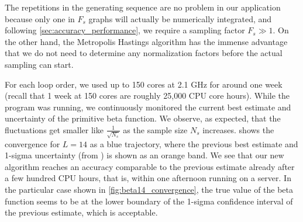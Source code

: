 \documentclass[12pt]{article}
\numberwithin{equation}{section}
\begin{document}
The repetitions in the generating sequence are no problem in our application because only one in $F_s$ graphs will actually be numerically integrated, and following \cref{sec:accuracy_performance}, we require a sampling factor $F_s \gg 1$. On the other hand, the Metropolis Hastings algorithm has the immense advantage that we do not need to determine any normalization factors before the actual sampling can start. 


For each loop order, we used up to 150 cores at 2.1 GHz for around one week (recall that 1 week at 150 cores are roughly 25,000 CPU core hours). While the program was running, we continuously monitored the current best estimate and uncertainty of the primitive beta function. We observe, as expected, that the fluctuations get smaller like $\frac{1}{\sqrt {N_s}}$ as the sample size $N_s$ increases.   shows the convergence for $L=14$ as a blue trajectory, where the previous best estimate and 1-sigma uncertainty (from \cite{balduf_statistics_2023}) is shown as an orange band. We see that our new algorithm reaches an accuracy comparable to the previous estimate already after a few hundred CPU hours, that is, within one afternoon running on a server. In the particular case shown in \cref{fig:beta14_convergence}, the true value of the beta function seems to be at the lower boundary of the 1-sigma confidence interval of the previous estimate, which is acceptable. 
\end{document}
